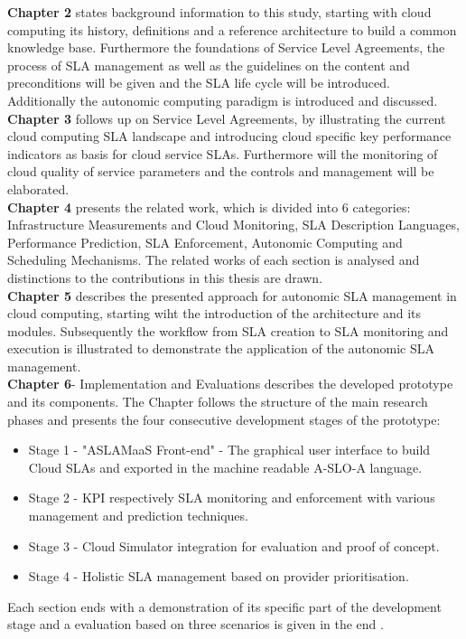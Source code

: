 \textbf{Chapter 2} states background information to this study, starting with cloud computing its history,  definitions and a reference architecture to build a common knowledge base. Furthermore the foundations of Service Level Agreements, the process of SLA management as well as the guidelines on the content and preconditions will be given and the SLA life cycle will be introduced. Additionally the autonomic computing paradigm is introduced and discussed.\\

\textbf{Chapter 3} follows up on Service Level Agreements, by illustrating the current cloud computing SLA landscape and introducing cloud specific key performance indicators as basis for cloud service SLAs. Furthermore will the monitoring of cloud quality of service parameters and the controls and management will be elaborated.\\

\textbf{Chapter 4} presents the related work, which is divided into 6 categories: Infrastructure Measurements and Cloud Monitoring, SLA Description Languages, Performance Prediction, SLA Enforcement, Autonomic Computing and Scheduling Mechanisms. The related works of each section is analysed and distinctions to the contributions in this thesis are drawn.\\

\textbf{Chapter 5}  describes the presented approach for autonomic SLA management in cloud computing, starting wiht the introduction of the architecture and its modules. Subsequently the workflow from SLA creation to SLA monitoring and execution is illustrated to demonstrate the application of the autonomic SLA management.\\

\textbf{Chapter 6}- Implementation and Evaluations describes the developed prototype and its components. The Chapter follows the structure of the main research phases and presents the four consecutive development stages of the prototype:
\begin{itemize}
\item  Stage 1 - "ASLAMaaS Front-end" - The graphical user interface to build Cloud SLAs and exported in the machine readable A-SLO-A language.
 \item Stage 2 - KPI respectively SLA monitoring and enforcement with various management and prediction techniques.
 \item Stage 3 - Cloud Simulator integration for evaluation and proof of concept. 
 \item Stage 4 - Holistic SLA management based on provider prioritisation.
\end{itemize}
 Each section ends with a demonstration of its specific part of the development stage and a evaluation based on three scenarios is given in the end .\\

